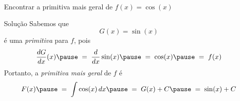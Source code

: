 \begin{question}
  Encontrar a primitiva mais geral de \(f(x)= \cos(x)\)
\end{question}

\begin{resolution}{Solução}
  Sabemos que
  \[
    G(x) = \sin(x)
  \]
  é uma \emph{primitiva} para $f$,
  \pause
  pois
  \[
    \frac{dG}{dx}(x)
    \pause
    \;=\; \frac{d}{dx}\sin(x)
    \pause
    \;=\; \cos(x)
    \pause
    \;=\; f(x)
  \]
  \pause
  Portanto, a \emph{primitiva mais geral} de $f$ é
  \pause
  \[
    F(x)
    \pause
    \;=\; \int \cos(x)\,dx
    \pause
    \;=\; G(x) + C
    \pause
    \;=\; \sin(x) + C
  \]
\end{resolution}

